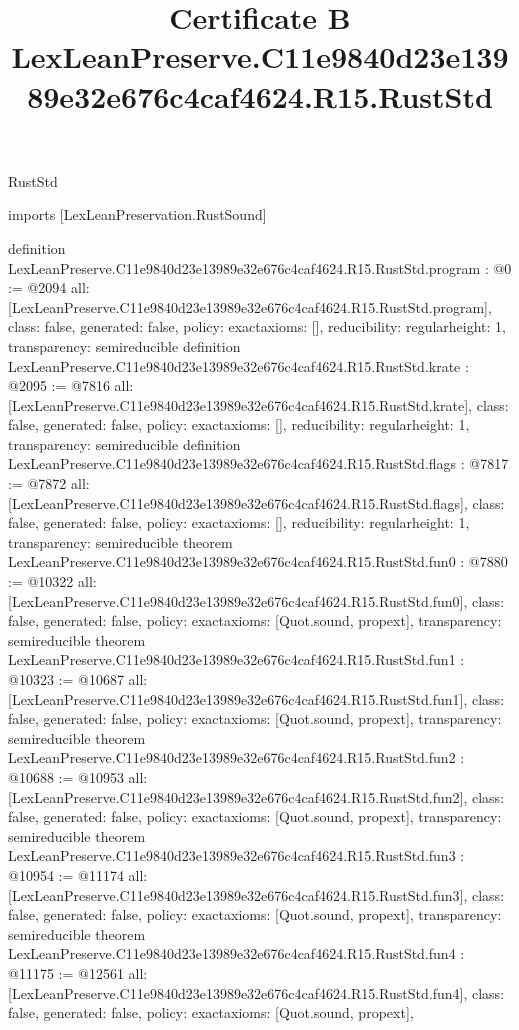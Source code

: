 \begin{lexlean}{RustStd}
\title{Certificate B LexLeanPreserve.C11e9840d23e13989e32e676c4caf4624.R15.RustStd}
\begin{coremodule}
imports [LexLeanPreservation.RustSound]

definition LexLeanPreserve.C11e9840d23e13989e32e676c4caf4624.R15.RustStd.program : @0 := @2094 {
  all: [LexLeanPreserve.C11e9840d23e13989e32e676c4caf4624.R15.RustStd.program],
  class: false,
  generated: false,
  policy: exact{axioms: []},
  reducibility: regular{height: 1},
  transparency: semireducible
}
definition LexLeanPreserve.C11e9840d23e13989e32e676c4caf4624.R15.RustStd.krate : @2095 := @7816 {
  all: [LexLeanPreserve.C11e9840d23e13989e32e676c4caf4624.R15.RustStd.krate],
  class: false,
  generated: false,
  policy: exact{axioms: []},
  reducibility: regular{height: 1},
  transparency: semireducible
}
definition LexLeanPreserve.C11e9840d23e13989e32e676c4caf4624.R15.RustStd.flags : @7817 := @7872 {
  all: [LexLeanPreserve.C11e9840d23e13989e32e676c4caf4624.R15.RustStd.flags],
  class: false,
  generated: false,
  policy: exact{axioms: []},
  reducibility: regular{height: 1},
  transparency: semireducible
}
theorem LexLeanPreserve.C11e9840d23e13989e32e676c4caf4624.R15.RustStd.fun0 : @7880 := @10322 {
  all: [LexLeanPreserve.C11e9840d23e13989e32e676c4caf4624.R15.RustStd.fun0],
  class: false,
  generated: false,
  policy: exact{axioms: [Quot.sound, propext]},
  transparency: semireducible
}
theorem LexLeanPreserve.C11e9840d23e13989e32e676c4caf4624.R15.RustStd.fun1 : @10323 := @10687 {
  all: [LexLeanPreserve.C11e9840d23e13989e32e676c4caf4624.R15.RustStd.fun1],
  class: false,
  generated: false,
  policy: exact{axioms: [Quot.sound, propext]},
  transparency: semireducible
}
theorem LexLeanPreserve.C11e9840d23e13989e32e676c4caf4624.R15.RustStd.fun2 : @10688 := @10953 {
  all: [LexLeanPreserve.C11e9840d23e13989e32e676c4caf4624.R15.RustStd.fun2],
  class: false,
  generated: false,
  policy: exact{axioms: [Quot.sound, propext]},
  transparency: semireducible
}
theorem LexLeanPreserve.C11e9840d23e13989e32e676c4caf4624.R15.RustStd.fun3 : @10954 := @11174 {
  all: [LexLeanPreserve.C11e9840d23e13989e32e676c4caf4624.R15.RustStd.fun3],
  class: false,
  generated: false,
  policy: exact{axioms: [Quot.sound, propext]},
  transparency: semireducible
}
theorem LexLeanPreserve.C11e9840d23e13989e32e676c4caf4624.R15.RustStd.fun4 : @11175 := @12561 {
  all: [LexLeanPreserve.C11e9840d23e13989e32e676c4caf4624.R15.RustStd.fun4],
  class: false,
  generated: false,
  policy: exact{axioms: [Quot.sound, propext]},
}
\end{coremodule}
\end{lexlean}
